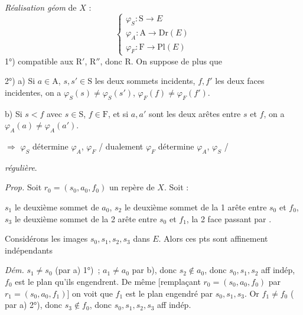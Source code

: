 \documentclass[11pt,a4paper]{article}
\begin{document}
\emph{Réalisation géom} de $X$ :
\[
\begin{cases}
\varphi_S : \mathrm{S}\to E\\
\varphi_A : \mathrm{A}\to \mathrm{Dr}(E)\\
\varphi_F : \mathrm{F}\to \mathrm{Pl}(E)
\end{cases}
\]
1°) compatible aux $\mathrm{R}'$, $\mathrm{R}''$, donc $\mathrm{R}$. On suppose de plus que

2°) a) Si $a\in\mathrm{A}$, $s,s'\in\mathrm{S}$ les deux sommets incidents, $f,f'$ les deux faces incidentes, on a $\varphi_S(s)\neq\varphi_S(s')$, $\varphi_F(f)\neq\varphi_F(f')$.

b) Si $s<f$ avec $s\in\mathrm{S}$, $f\in\mathrm{F}$, et si $a,a'$ sont les deux arêtes entre $s$ et $f$, on a $\varphi_A(a)\neq\varphi_A(a')$.

$\Longrightarrow$ $\varphi_S$ détermine $\varphi_A$, $\varphi_F$ / dualement $\varphi_F$ détermine $\varphi_A$, $\varphi_S$ /

 \emph{régulière}.

\emph{Prop.} Soit $r_0=(s_0,a_0,f_0)$ un repère de $X$. Soit :

$s_1$ le deuxième sommet de $a_0$, $s_2$ le deuxième sommet de la 1 arête  entre $s_0$ et $f_0$, $s_3$ le deuxième sommet de la 2 arête entre $s_0$ et $f_1$, la 2 face passant par .

Considérons les images $s_0,s_1,s_2,s_3$ dans $E$. Alors ces pts sont affinement indépendants

\emph{Dém.} $s_1\neq s_0$ (par a) 1°) \,; $a_1\neq a_0$ par b), donc $s_2\notin a_0$, donc $s_0,s_1,s_2$ aff indép, $f_0$ est le plan qu'ils engendrent. De même [remplaçant $r_0=(s_0,a_0,f_0)$ par $r_1=(s_0,a_0,f_1)$] on voit que $f_1$ est le plan engendré par $s_0,s_1,s_3$. Or $f_1\neq f_0$ (\struck{\ill{}} par a) 2°), donc $s_3\notin f_0$, donc $s_0,s_1,s_2,s_3$ aff indép.
\end{document}
